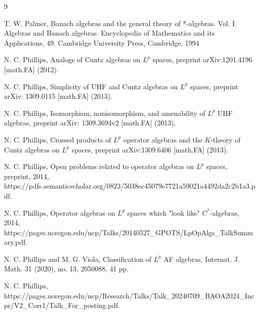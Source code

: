\documentclass[reqno,11pt]{amsart}
\theoremstyle{plain}
\theoremstyle{definition}
\theoremstyle{remark}
\begin{document}
\begin{thebibliography}{9}



T. W. Palmer, Banach algebras and the general theory of *-algebras. Vol. I. Algebras and Banach algebras. Encyclopedia of Mathematics and its Applications, 49. Cambridge University Press, Cambridge, 1994


N. C. Phillips, Analogs of Cuntz algebras on $L^p$ spaces, preprint arXiv:1201.4196 [math.FA] (2012).

N. C. Phillips, Simplicity of UHF and Cuntz algebras on $L^p$ spaces, preprint arXiv:
1309.0115 [math.FA] (2013).

N. C. Phillips, Isomorphism, nonisomorphism, and amenability of $L^p$ UHF algebras, preprint arXiv: 1309.3694v2 [math.FA] (2013).

N. C. Phillips, Crossed products of $L^{p}$ operator algebras and the $K$-theory of Cuntz algebras on $L^{p}$ spaces, preprint arXiv:1309.6406 [math.FA] (2013).


N. C. Phillips, Open problems related to operator algebras on $L^{p}$ spaces, preprint,
2014, https://pdfs.semanticscholar.org/0823/5038ec45079e7721a59021a4492da2c2b1a3.pdf.

N. C. Phillips, Operator algebras on $L^{p}$ spaces which "look like" $C^{*}$-algebras,
2014, https://pages.uoregon.edu/ncp/Talks/20140527_GPOTS/LpOpAlgs_TalkSummary.pdf.

N. C. Phillips  and M. G. Viola, Classification of $L^p$ AF algebras, Internat. J. Math. 31 (2020), no. 13, 2050088, 41 pp.

N. C. Phillips, https://pages.uoregon.edu/ncp/Research/Talks/Talk_20240709_BAOA2024_Incpr/V2_Corr1/Talk_For_posting.pdf.



%


\end{thebibliography}
\end{document}
